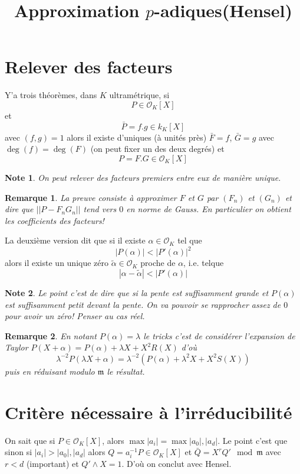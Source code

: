 \documentclass[a4paper,12pt]{book}
\title{Approximation $p$-adiques(Hensel)}
\date{}
\newcommand{\Or}{\mathcal{O}}
\newcommand{\m}{\mathfrak m}
\theoremstyle{plain}
\newtheorem{rem}{Remarque}
\newtheorem{note}{Note}
\theoremstyle{definition}
\theoremstyle{remark}
\begin{document}
\maketitle


\section{Relever des facteurs}
Y'a trois théorèmes, dans $K$ ultramétrique, si 
\[P\in \Or_K[X]\]
et
\[\bar P= f.g\in k_K[X]\]
avec $(f,g)=1$ alors il existe d'uniques (à unités près)
$\bar F=f$, $\bar G=g$ 
avec $\deg(f)=\deg(F)$ (on peut fixer un des deux degrés) et
\[P=F.G\in \Or_K[X]\]
\begin{note}
    On peut relever des facteurs premiers entre eux de manière
    unique.
\end{note}
\begin{rem}
    La preuve consiste à approximer $F$ et $G$ par $(F_n)$
    et $(G_n)$ et dire que $||P-F_nG_n||$ tend vers $0$ en
    norme de Gauss. En particulier on obtient les coefficients
    des facteurs!
\end{rem}
La deuxième version dit que si il existe $\alpha\in \Or_K$
tel que \[|P(\alpha)|<|P'(\alpha)|^2\] alors il existe un unique
zéro $\widetilde\alpha\in \Or_K$ proche de $\alpha$, i.e. 
telque 
\[|\alpha-\tilde\alpha|<|P'(\alpha)|\]
\begin{note}
    Le point c'est de dire que si la pente est suffisamment grande
    et $P(\alpha)$ est suffisamment petit devant la pente. On
    va pouvoir se rapprocher assez de $0$ pour avoir un zéro!
    Penser au cas réel.
\end{note}
\begin{rem}
    En notant $P(\alpha)=\lambda$ le tricks c'est de considérer 
    l'expansion de Taylor $P(X+\alpha)=P(\alpha)+\lambda X+X^2R(X)$
    d'où
    \[\lambda^{-2}P(\lambda X+\alpha)=\lambda^{-2}(P(\alpha)+\lambda^2 X+X^2S(X))\]
    puis en réduisant modulo $\m$ le résultat.
\end{rem}
\section{Critère nécessaire à l'irréducibilité}
On sait que si $P\in \Or_K[X]$, alors 
$\max |a_i|=\max |a_0|,|a_d|$. Le point c'est que sinon si 
$|a_i|>|a_0|,|a_d|$ alors $Q=a_i^{-1}P\in\Or_K[X]$ et 
$\bar Q=X^rQ'\mod \m$ avec $r<d$ (important) et $Q'\wedge X=1$.
D'où on conclut avec Hensel.
\end{document}
